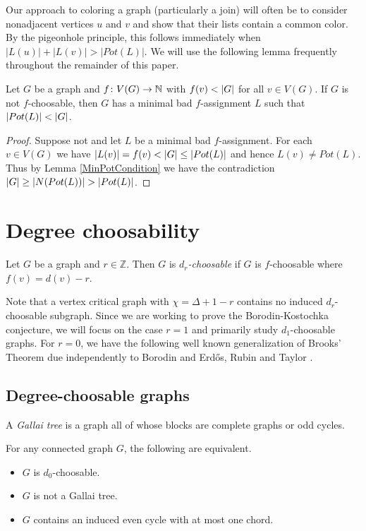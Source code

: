 Our approach to coloring a graph (particularly a join) will often be to
consider nonadjacent vertices $u$ and $v$ and show that their lists contain a
common color.  By the pigeonhole principle, this follows immediately when
$|L(u)|+|L(v)|>|Pot(L)|$.  We will use the following lemma frequently throughout
the remainder of this paper.

\begin{SmallPotLemma}
Let $G$ be a graph and $f\colon V(G) \rightarrow \mathbb{N}$ with $f(v) < \left|G\right|$ for all $v \in V(G)$.  If $G$ is not $f$-choosable, then $G$ has a minimal bad $f$-assignment $L$ such that $\left|Pot(L)\right| < \left|G\right|$.
\end{SmallPotLemma}
\begin{proof}
Suppose not and let $L$ be a minimal bad $f$-assignment. For each $v \in V(G)$ we have $\left|L(v)\right| = f(v) < \left|G\right| \leq \left|Pot(L)\right|$ and hence $L(v) \neq Pot(L)$.  Thus by Lemma \ref{MinPotCondition} we have the contradiction $\left|G\right| \geq \left|N(Pot(L))\right| > \left|Pot(L)\right|$.
\end{proof}

\section{Degree choosability}
\label{Degree choosability}
\begin{defn}
Let $G$ be a graph and $r \in \mathbb{Z}$.  Then $G$ is \emph{$d_r$-choosable} if $G$ is $f$-choosable where $f(v) = d(v) - r$.
\end{defn}

Note that a vertex critical graph with $\chi = \Delta + 1 - r$ contains no
induced $d_r$-choosable subgraph.  Since we are working to prove the
Borodin-Kostochka conjecture, we will focus on the case $r=1$ and primarily
study $d_1$-choosable graphs.  For $r=0$, we have the following well known generalization of Brooks' Theorem due independently to Borodin \cite{borodin1977criterion} and Erd\H{o}s, Rubin and Taylor \cite{erdos1979choosability}. 

\subsection{Degree-choosable graphs}
\begin{defn}
A \emph{Gallai tree} is a graph all of whose blocks are complete graphs or odd cycles.
\end{defn}

\begin{ClassificationOfd0}
For any connected graph $G$, the following are equivalent.
\begin{itemize}
\item $G$ is $d_0$-choosable.
\item $G$ is not a Gallai tree.
\item $G$ contains an induced even cycle with at most one chord.
\end{itemize}
\end{ClassificationOfd0}

